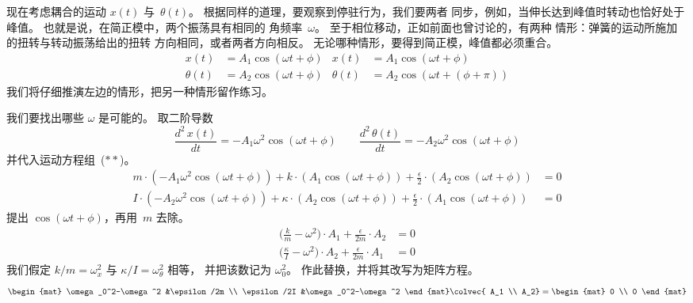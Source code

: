 现在考虑耦合的运动 $x(t)$ 与~$\theta(t)$。
根据同样的道理，要观察到停驻行为，我们要两者
同步，例如，当伸长达到峰值时转动也恰好处于
峰值。
也就是说，在简正模中，两个振荡具有相同的
角频率~$\omega$。
至于相位移动，正如前面也曾讨论的，有两种
情形：弹簧的运动所施加的扭转与转动振荡给出的扭转
方向相同，或者两者方向相反。
无论哪种情形，要得到简正模，峰值都必须重合。
\begin{align*}
  x(t) &= A_1\cos(\omega t+\phi)  
       &x(t) &= A_1\cos(\omega t+\phi)   \\  
  \theta(t) &= A_2\cos(\omega t+\phi)  
       &\theta(t) &= A_2\cos(\omega t+(\phi+\pi))    
\end{align*}
我们将仔细推演左边的情形，把另一种情形留作练习。

我们要找出哪些 $\omega$ 是可能的。
取二阶导数
\begin{equation*}
  \frac{d^2\,x(t)}{dt}=-A_1\omega^2\cos(\omega t+\phi)
  \qquad
  \frac{d^2\,\theta(t)}{dt}=-A_2\omega^2\cos(\omega t+\phi)
\end{equation*}
并代入运动方程组~($**$)。
\begin{align*}
  m\cdot(-A_1\omega^2\cos(\omega t+\phi))
      +k\cdot (A_1\cos(\omega t+\phi))
      +\frac{\epsilon}{2}\cdot (A_2\cos(\omega t+\phi)) 
      &=0  \\
  I\cdot(-A_2\omega^2\cos(\omega t+\phi))
      +\kappa\cdot (A_2\cos(\omega t+\phi))
      +\frac{\epsilon}{2}\cdot (A_1\cos(\omega t+\phi))  
      &=0  
\end{align*}
提出 $\cos(\omega t+\phi)$，再用~$m$ 去除。
\begin{align*}
  \big(\frac{k}{m}-\omega^2\big)\cdot A_1 
      +\frac{\epsilon}{2m}\cdot A_2 
      &=0  \\
  \big(\frac{\kappa}{I}-\omega^2\big)\cdot A_2
      +\frac{\epsilon}{2m}\cdot A_1  
      &=0  
\end{align*}
我们假定 $k/m=\omega_{x}^2$
与 $\kappa/I=\omega_{\theta}^2$ 相等，
并把该数记为 $\omega_0^2$。
作此替换，并将其改写为矩阵方程。
\begin{equation*}
  \begin{mat}
    \omega_0^2-\omega^2    &\epsilon/2m  \\
    \epsilon/2I &\omega_0^2-\omega^2 
  \end{mat}
  \colvec{
    A_1 \\
    A_2}
  =
  \begin{mat}
    0 \\
    0
  \end{mat}
\end{equation*}

